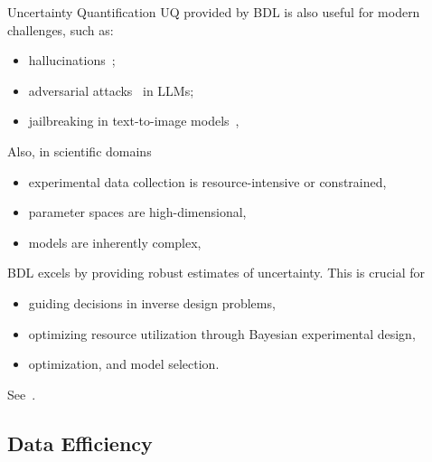 \documentclass[9pt,handout]{beamer}
\begin{document}
\begin{frame}{Uncertainty Quantification}
UQ provided by BDL is also useful for modern challenges, such as:
	\begin{itemize}[<+->]
		\item hallucinations~\citep{ji2023survey};
		\item adversarial attacks~\citep{andriushchenko2023adversarial} in LLMs;
		\item jailbreaking in text-to-image models~\citep{yang2023sneakyprompt},
	\end{itemize}	
Also, in scientific domains
\begin{itemize}[<+->]
	\item  experimental data collection is resource-intensive or constrained, 
	\item parameter spaces are high-dimensional, 
	\item models are inherently complex,
\end{itemize}
BDL excels by providing \alert{robust estimates of uncertainty}. This is crucial for 
\begin{itemize}[<+->]
	\item guiding decisions in inverse design problems, 
	\item optimizing resource utilization through Bayesian experimental design, 
	\item optimization, and model selection.
\end{itemize}
See~\citet{li2023study, Rainforth2023ModernBE, bamler2020augmenting,immer2021scalable,immer2023stochastic}.
\end{frame}

\subsection{Data Efficiency}
\end{document}
